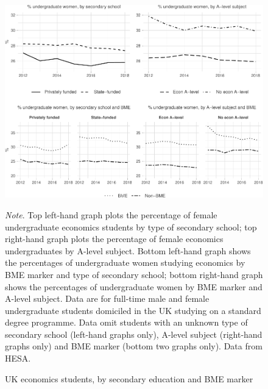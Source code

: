 \documentclass[a4paper, 1]{article}
\begin{document}
\begin{figure}[h!]
\centering
\includegraphics[width=\linewidth]{0-images/secondary-1.pdf}

\caption{UK economics students, by secondary education and BME marker}
\label{fig:secondary}
\justify\footnotesize\textit{Note}.  Top left-hand graph plots the percentage of female undergraduate economics students by type of secondary school; top right-hand graph plots the percentage of female economics undergraduates by A-level subject. Bottom left-hand graph shows the percentages of undergraduate women studying economics by BME marker and type of secondary school; bottom right-hand graph shows the percentages of undergraduate women by BME marker and A-level subject. Data are for full-time male and female undergraduate students domiciled in the UK studying on a standard degree programme. Data omit students with an unknown type of secondary school (left-hand graphs only), A-level subject (right-hand graphs only) and BME marker (bottom two graphs only). Data from HESA.
\end{figure}
\end{document}
